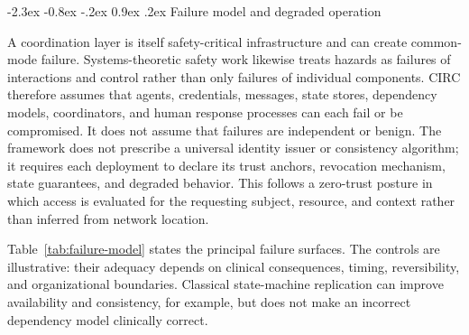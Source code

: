 \documentclass[10pt]{article}
\makeatletter
\renewcommand\section{\@startsection{section}{1}{\z@}%
  {-2.3ex \@plus -0.8ex \@minus -.2ex}%
  {0.9ex \@plus .2ex}%
  {\normalfont\sffamily\bfseries\normalsize}}
\makeatother
\begin{document}
\section{Failure model and degraded operation}

A coordination layer is itself safety-critical infrastructure and can create common-mode failure.
Systems-theoretic safety work likewise treats hazards as failures of interactions and control rather
than only failures of individual components.\cite{leveson2004new} CIRC therefore assumes that agents,
credentials, messages, state stores, dependency models,
coordinators, and human response processes can each fail or be compromised. It does not assume that
failures are independent or benign. The framework does not prescribe a universal identity issuer or
consistency algorithm; it requires each deployment to declare its trust anchors, revocation mechanism,
state guarantees, and degraded behavior. This follows a zero-trust posture in which access is
evaluated for the requesting subject, resource, and context rather than inferred from network
location.\cite{rose2020zerotrust}

Table~\ref{tab:failure-model} states the principal failure surfaces. The controls are illustrative:
their adequacy depends on clinical consequences, timing, reversibility, and organizational boundaries.
Classical state-machine replication can improve availability and consistency, for example, but does
not make an incorrect dependency model clinically correct.\cite{schneider1990statemachine}
\end{document}
